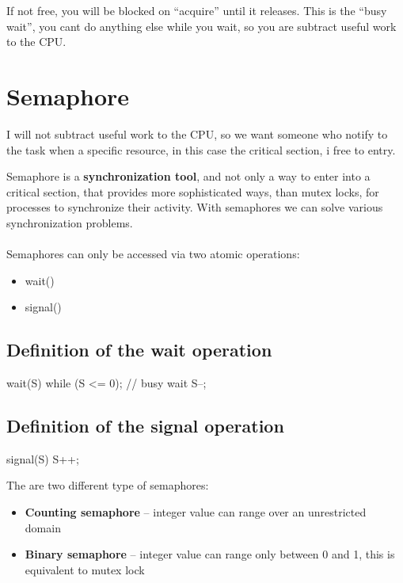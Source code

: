 If not free, you will be blocked on “acquire” until it releases. This is the “busy wait”, you cant do anything else while you wait, so you are subtract useful work to the CPU.

\newpage
\section{Semaphore}

I will not subtract useful work to the CPU, so we want someone who notify to the task when a specific resource, in this case the critical section, i free to entry. 

Semaphore is a \textbf{synchronization tool}, and not only a way to enter into a critical section, that provides more sophisticated ways, than mutex locks, for processes to synchronize their activity.  With semaphores we can solve various synchronization problems.

\paragraph{}
Semaphores can only be accessed via two atomic operations:

\begin{itemize}
    \item wait()
    \item signal()
\end{itemize}

\subsection{Definition of the wait operation}

\begin{codeInC}
wait(S) {
    while (S <= 0); // busy wait
    S--;
}

\end{codeInC}

\subsection{Definition of the signal operation}

\begin{codeInC}
signal(S) {
    S++;
} 
\end{codeInC}

The are two different type of semaphores:

\begin{itemize}
    \item \textbf{Counting semaphore} – integer value can range over an unrestricted domain
    \item \textbf{Binary semaphore} – integer value can range only between 0 and 1, this is equivalent to mutex lock
\end{itemize}


